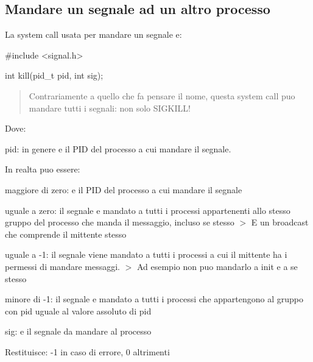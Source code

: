 \subsection*{Mandare un segnale ad un altro processo}

La system call usata per mandare un segnale e\textquotesingle{}\+:


\begin{DoxyCode}
\textcolor{preprocessor}{#include <signal.h>}

\textcolor{keywordtype}{int} kill(pid\_t pid, \textcolor{keywordtype}{int} sig);
\end{DoxyCode}
 \begin{quote}
Contrariamente a quello che fa pensare il nome, questa system call puo\textquotesingle{} mandare tutti i segnali\+: non solo S\+I\+G\+K\+I\+L\+L! \end{quote}


Dove\+:
\begin{DoxyItemize}
\item {\ttfamily pid}\+: in genere e\textquotesingle{} il P\+ID del processo a cui mandare il segnale.

In realta\textquotesingle{} puo\textquotesingle{} essere\+:
\begin{DoxyItemize}
\item maggiore di zero\+: e\textquotesingle{} il P\+ID del processo a cui mandare il segnale
\item uguale a zero\+: il segnale e\textquotesingle{} mandato a tutti i processi appartenenti allo stesso gruppo del processo che manda il messaggio, incluso se stesso $>$ E\textquotesingle{} un broadcast che comprende il mittente stesso
\item uguale a -\/1\+: il segnale viene mandato a tutti i processi a cui il mittente ha i permessi di mandare messaggi. $>$ Ad esempio non puo\textquotesingle{} mandarlo a init e a se stesso
\item minore di -\/1\+: il segnale e\textquotesingle{} mandato a tutti i processi che appartengono al gruppo con pid uguale al valore assoluto di {\ttfamily pid}
\end{DoxyItemize}
\item {\ttfamily sig}\+: e\textquotesingle{} il segnale da mandare al processo
\item Restituisce\+: -\/1 in caso di errore, 0 altrimenti
\end{DoxyItemize}

